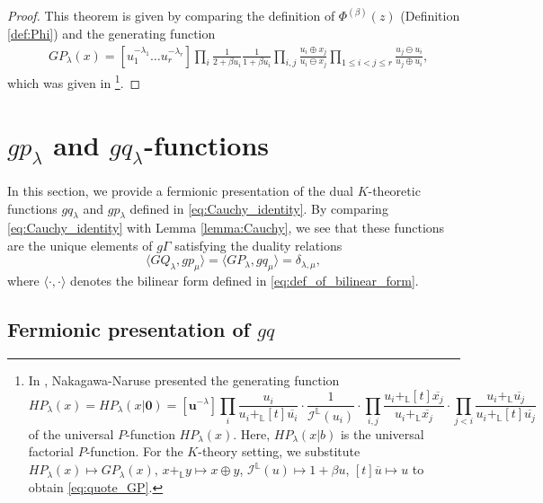 \documentclass{amsart}
\def\LL{\mathbb{L}}
\begin{document}
\begin{proof}
This theorem is given by comparing the definition of $\Phi^{(\beta)}(z)$ (Definition \ref{def:Phi})
and the generating function 
\begin{align}\label{eq:quote_GP}
&GP_\lambda(x)=[u_1^{-\lambda_1}\dots u_r^{-\lambda_r}]
\prod_{i}
\frac{1}{2+\beta u_i}
\frac{1}{1+\beta u_i}
\prod_{i,j}\frac{u_i\oplus x_j}{u_i\ominus x_j}
\prod_{1\leq i<j\leq r}\frac{u_j\ominus u_i}{u_j\oplus u_i},
\end{align}
which was given in \cite[\S 4.1]{nakagawa2018universalfactrial}\footnote{
In \cite[\S 4.1]{nakagawa2018universalfactrial}, Nakagawa-Naruse presented the generating function
\[
HP_{\lambda}(x)
=HP_{\lambda}(x|\mathbf{0})
=[\mathbf{u}^{-\lambda}]
\prod_i\frac{u_i}{u_i+_{\LL}[t]\overline{u_i}}\cdot
\frac{1}{\mathcal{I}^{\LL}(u_i)}\cdot
\prod_{i,j}\frac{u_i+_{\LL}[t]\overline{x_j}}{u_i+_{\LL}\overline{x_j}}
\cdot
\prod_{j<i}
\frac{u_i+_{\LL}\overline{u_j}}{u_i+_{\LL}[t]\overline{u_j}}
\]
of the universal $P$-function $HP_\lambda(x)$.
Here, $HP_\lambda(x|b)$ is the universal factorial $P$-function.
For the $K$-theory setting, we substitute
$HP_\lambda(x)\mapsto GP_\lambda(x)$,
$x+_{\LL}y\mapsto x\oplus y$,
$\mathcal{I}^{\LL}(u)\mapsto 1+\beta u$,
$[t]\overline{u}\mapsto u$
to obtain \eqref{eq:quote_GP}.
}.
\end{proof}


\section{$gp_\lambda$ and $gq_\lambda$-functions}\label{sec:gp_and_gq}

In this section, we provide a fermionic presentation of the dual $K$-theoretic functions $gq_\lambda$ and $gp_\lambda$ defined in \eqref{eq:Cauchy_identity}.
By comparing \eqref{eq:Cauchy_identity} with Lemma \ref{lemma:Cauchy}, we see that these functions are the unique elements of $g\Gamma$ satisfying the duality relations
\[
\langle
GQ_\lambda,gp_\mu
\rangle 
=
\langle
GP_\lambda,gq_\mu
\rangle 
=\delta_{\lambda,\mu},
\]
where $\langle \cdot,\cdot\rangle$ denotes the bilinear form defined in \eqref{eq:def_of_bilinear_form}.




\subsection{Fermionic presentation of $gq$}\label{sec:Fermion_of_gq}
\end{document}
